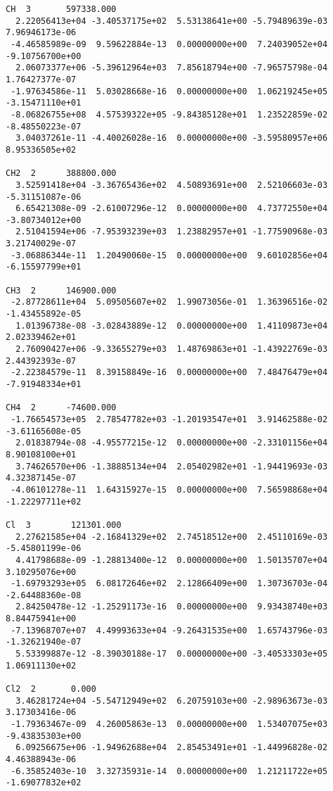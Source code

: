 \begin{verbatim}
CH  3		597338.000							 
  2.22056413e+04 -3.40537175e+02  5.53138641e+00 -5.79489639e-03  7.96946173e-06
 -4.46585989e-09  9.59622884e-13  0.00000000e+00  7.24039052e+04 -9.10756700e+00
  2.06073377e+06 -5.39612964e+03  7.85618794e+00 -7.96575798e-04  1.76427377e-07
 -1.97634586e-11  5.03028668e-16  0.00000000e+00  1.06219245e+05 -3.15471110e+01
 -8.06826755e+08  4.57539322e+05 -9.84385128e+01  1.23522859e-02 -8.48550223e-07
  3.04037261e-11 -4.40026028e-16  0.00000000e+00 -3.59580957e+06  8.95336505e+02
										 
CH2  2		388800.000						         
  3.52591418e+04 -3.36765436e+02  4.50893691e+00  2.52106603e-03 -5.31151087e-06
  6.65421308e-09 -2.61007296e-12  0.00000000e+00  4.73772550e+04 -3.80734012e+00
  2.51041594e+06 -7.95393239e+03  1.23882957e+01 -1.77590968e-03  3.21740029e-07
 -3.06886344e-11  1.20490060e-15  0.00000000e+00  9.60102856e+04 -6.15597799e+01
										 
CH3  2		146900.000						         
 -2.87728611e+04  5.09505607e+02  1.99073056e-01  1.36396516e-02 -1.43455892e-05
  1.01396738e-08 -3.02843889e-12  0.00000000e+00  1.41109873e+04  2.02339462e+01
  2.76090427e+06 -9.33655279e+03  1.48769863e+01 -1.43922769e-03  2.44392393e-07
 -2.22384579e-11  8.39158849e-16  0.00000000e+00  7.48476479e+04 -7.91948334e+01
										 
CH4  2		-74600.000						         
 -1.76654573e+05  2.78547782e+03 -1.20193547e+01  3.91462588e-02 -3.61165608e-05
  2.01838794e-08 -4.95577215e-12  0.00000000e+00 -2.33101156e+04  8.90108100e+01
  3.74626570e+06 -1.38885134e+04  2.05402982e+01 -1.94419693e-03  4.32387145e-07
 -4.06101278e-11  1.64315927e-15  0.00000000e+00  7.56598868e+04 -1.22297711e+02
										 
Cl  3		 121301.000							 
  2.27621585e+04 -2.16841329e+02  2.74518512e+00  2.45110169e-03 -5.45801199e-06
  4.41798688e-09 -1.28813400e-12  0.00000000e+00  1.50135707e+04  3.10295076e+00
 -1.69793293e+05  6.08172646e+02  2.12866409e+00  1.30736703e-04 -2.64488360e-08
  2.84250478e-12 -1.25291173e-16  0.00000000e+00  9.93438740e+03  8.84475941e+00
 -7.13968707e+07  4.49993633e+04 -9.26431535e+00  1.65743796e-03 -1.32621940e-07
  5.53399887e-12 -8.39030188e-17  0.00000000e+00 -3.40533303e+05  1.06911130e+02
										 
Cl2  2		 0.000							         
  3.46281724e+04 -5.54712949e+02  6.20759103e+00 -2.98963673e-03  3.17303416e-06
 -1.79363467e-09  4.26005863e-13  0.00000000e+00  1.53407075e+03 -9.43835303e+00
  6.09256675e+06 -1.94962688e+04  2.85453491e+01 -1.44996828e-02  4.46388943e-06
 -6.35852403e-10  3.32735931e-14  0.00000000e+00  1.21211722e+05 -1.69077832e+02
										 

\end{verbatim}
